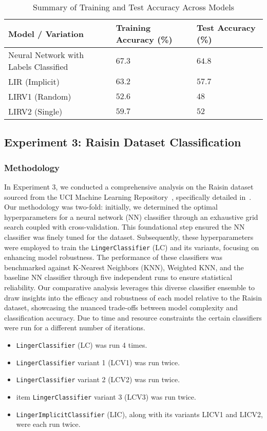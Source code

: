\documentclass[a4paper, 12pt]{report}
\begin{document}
\begin{table}[H]
    \centering
    \caption{Summary of Training and Test Accuracy Across Models}
    \label{tab:summary_accuracy_all_models_accuracy_exp2}
    \footnotesize
    \begin{tabular}{|l|l|l|}
    \toprule
    \textbf{Model / Variation} & \textbf{Training Accuracy (\%)} & \textbf{Test Accuracy (\%)} \\
    \midrule
    Neural Network with Labels Classified & $67.3$ & $\mathbf{64.8}$ \\
    LIR (Implicit) & $63.2$ & $57.7$ \\
    LIRV1 (Random) & $52.6$ & $48$ \\
    LIRV2 (Single) & $59.7$ & $52$ \\
    \bottomrule
    \end{tabular}
\end{table}

\subsection{Experiment 3: Raisin Dataset Classification}
\subsubsection{Methodology}
In Experiment 3, we conducted a comprehensive analysis on the Raisin dataset sourced from the UCI Machine Learning Repository~\cite{uciDatasets}, 
specifically detailed in~\cite{misc_raisin_850}. Our methodology was two-fold: initially, we determined the optimal hyperparameters for a neural network (NN) classifier 
through an exhaustive grid search coupled with cross-validation. This foundational step ensured the NN classifier was finely tuned for the dataset. 
Subsequently, these hyperparameters were employed to train the \texttt{LingerClassifier} (LC) and its variants, focusing on enhancing model robustness. 
The performance of these classifiers was benchmarked against K-Nearest Neighbors (KNN), Weighted KNN, and the baseline NN classifier through five independent
 runs to ensure statistical reliability. Our comparative analysis leverages this diverse classifier ensemble to draw insights into the efficacy and robustness of 
 each model relative to the Raisin dataset, showcasing the nuanced trade-offs between model complexity and classification accuracy.
 Due to time and resource constraints the certain classifiers were run for a different number of iterations.
\begin{itemize}
    \item \texttt{LingerClassifier} (LC) was run 4 times.
    \item \texttt{LingerClassifier} variant 1 (LCV1) was run twice.
    \item \texttt{LingerClassifier} variant 2 (LCV2) was run twice.
    \item item \texttt{LingerClassifier} variant 3 (LCV3) was run twice.
    \item \texttt{LingerImplicitClassifier} (LIC), along with its variants LICV1 and LICV2, were each run twice.
\end{itemize}
\end{document}
